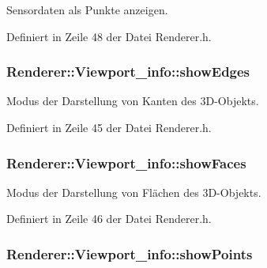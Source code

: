 Sensordaten als Punkte anzeigen. 



Definiert in Zeile 48 der Datei Renderer.\-h.

\hypertarget{structRenderer_1_1Viewport__info_a61ce4c293d9dc97da9b4ed2f8f7a36e0}{
\subsubsection[{show\-Edges}]{ Renderer\-::\-Viewport\-\_\-info\-::show\-Edges}}\label{structRenderer_1_1Viewport__info_a61ce4c293d9dc97da9b4ed2f8f7a36e0}


Modus der Darstellung von Kanten des 3\-D-\/\-Objekts. 



Definiert in Zeile 45 der Datei Renderer.\-h.

\hypertarget{structRenderer_1_1Viewport__info_aa1f3f4b18210cf0bc69df0c9015e8acf}{
\subsubsection[{show\-Faces}]{ Renderer\-::\-Viewport\-\_\-info\-::show\-Faces}}\label{structRenderer_1_1Viewport__info_aa1f3f4b18210cf0bc69df0c9015e8acf}


Modus der Darstellung von Flächen des 3\-D-\/\-Objekts. 



Definiert in Zeile 46 der Datei Renderer.\-h.

\hypertarget{structRenderer_1_1Viewport__info_ab95af83b6e3e068e14b37187a11709b7}{
\subsubsection[{show\-Points}]{ Renderer\-::\-Viewport\-\_\-info\-::show\-Points}}\label{structRenderer_1_1Viewport__info_ab95af83b6e3e068e14b37187a11709b7}


